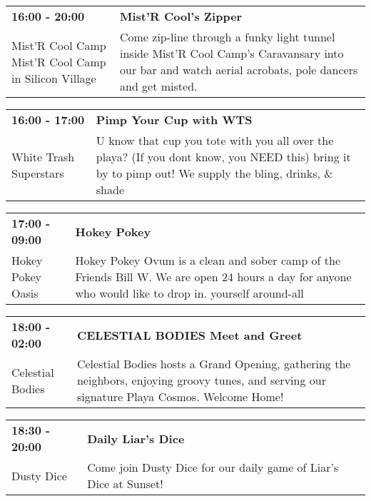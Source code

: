 \begin{tabular}{ p{1in} p{2.2in} }
    \textbf{16:00 - 20:00} & \textbf{Mist'R Cool's Zipper} \\
    Mist'R Cool Camp \newline Mist'R Cool Camp in Silicon Village & Come zip-line through a funky light tunnel inside Mist'R Cool Camp's Caravansary into our bar and watch aerial acrobats, pole dancers and get misted. \\
    \hline 
\end{tabular}
    
\begin{tabular}{ p{1in} p{2.2in} }
    \textbf{16:00 - 17:00} & \textbf{Pimp Your Cup with WTS} \\
    White Trash Superstars \newline  & U know that cup you tote with you all over the playa? (If you dont know, you NEED this) bring it by to pimp out! We supply the bling, drinks, \& shade \\
    \hline 
\end{tabular}
    
\begin{tabular}{ p{1in} p{2.2in} }
    \textbf{17:00 - 09:00} & \textbf{Hokey Pokey} \\
    Hokey Pokey Oasis \newline  & Hokey Pokey Ovum is a clean and sober camp of the Friends Bill W. We are open 24 hours a day for anyone who would like to drop in. yourself around-all \\
    \hline 
\end{tabular}
    
\begin{tabular}{ p{1in} p{2.2in} }
    \textbf{18:00 - 02:00} & \textbf{CELESTIAL BODIES Meet and Greet} \\
    Celestial Bodies \newline  & Celestial Bodies hosts a Grand Opening, gathering the neighbors, enjoying groovy tunes, and serving our signature Playa Cosmos. Welcome Home! \\
    \hline 
\end{tabular}
    
\begin{tabular}{ p{1in} p{2.2in} }
    \textbf{18:30 - 20:00} & \textbf{Daily Liar's Dice} \\
    Dusty Dice \newline  & Come join Dusty Dice for our daily game of Liar's Dice at Sunset! \\
    \hline 
\end{tabular}
    
